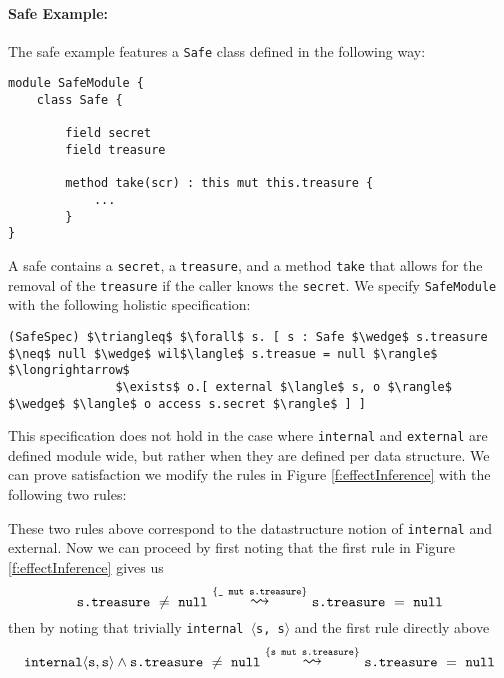 \documentclass[12pt]{article}
\newcommand\trans[1]{\overset{#1}{\mathlarger{\mathlarger \leadsto}}}
\begin{document}
\paragraph{Safe Example:} The safe example features a \texttt{Safe} class defined in the following way:
\begin{lstlisting}[mathescape=true]
module SafeModule {
	class Safe {
	
		field secret
		field treasure
		
		method take(scr) : this mut this.treasure {
			...
		}
}
\end{lstlisting}
A safe contains a \texttt{secret}, a \texttt{treasure}, and a method \texttt{take} that allows for the removal 
of the \texttt{treasure} if the caller knows the \texttt{secret}. We specify \texttt{SafeModule} with the following holistic specification:
\begin{lstlisting}[mathescape=true]
(SafeSpec) $\triangleq$ $\forall$ s. [ s : Safe $\wedge$ s.treasure $\neq$ null $\wedge$ wil$\langle$ s.treasue = null $\rangle$ $\longrightarrow$
               $\exists$ o.[ external $\langle$ s, o $\rangle$ $\wedge$ $\langle$ o access s.secret $\rangle$ ] ] 
\end{lstlisting}
This specification does not hold in the case where \texttt{internal} and \texttt{external} are defined module wide, 
but rather when they are defined per data structure. We can prove satisfaction we modify the rules in Figure \ref{f:effectInference} with the following two
rules:
These two rules above correspond to the datastructure notion of \texttt{internal} and external.
Now we can proceed by first noting that the first rule in Figure \ref{f:effectInference} gives us
$$\texttt{s.treasure}\ \neq\ \texttt{null}\ \trans{\{\texttt{\_ mut s.treasure}\}} \ \texttt{s.treasure}\ =\ \texttt{null}$$
then by noting that trivially \texttt{internal $\langle$s, s$\rangle$} and the first rule directly above
$$\texttt{internal}\langle \texttt{s}, \texttt{s} \rangle \wedge \texttt{s.treasure}\ \neq\ \texttt{null}\ \trans{\{\texttt{s mut s.treasure}\}} \ \texttt{s.treasure}\ =\ \texttt{null}$$
\end{document}
